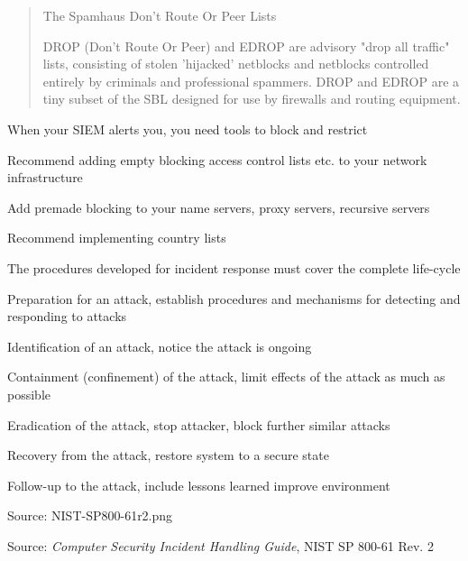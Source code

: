 \documentclass[Screen16to9,17pt]{foils}
\begin{document}

\begin{quote}
The Spamhaus Don't Route Or Peer Lists

DROP (Don't Route Or Peer) and EDROP are advisory "drop all traffic" lists, consisting of stolen 'hijacked' netblocks and netblocks controlled entirely by criminals and professional spammers. DROP and EDROP are a tiny subset of the SBL designed for use by firewalls and routing equipment.
\end{quote}



\begin{list2}
\item When your SIEM alerts you, you need tools to block and restrict
\item Recommend adding empty blocking access control lists etc. to your network infrastructure
\item Add premade blocking to your name servers, proxy servers, recursive servers
\item Recommend implementing country lists
\end{list2}




The procedures developed for incident response must cover the complete life-cycle

\begin{list2}
\item  Preparation for an attack, establish procedures and mechanisms for detecting and responding to attacks
\item  Identification of an attack, notice the attack is ongoing
\item  Containment (confinement) of the attack, limit effects of the attack as much as possible
\item  Eradication of the attack, stop attacker, block further similar attacks
\item  Recovery from the attack, restore system to a secure state
\item  Follow-up to the attack, include lessons learned  improve environment
\end{list2}
Source: NIST-SP800-61r2.png



Source: \emph{Computer Security Incident Handling Guide}, NIST SP 800-61 Rev. 2
\end{document}
